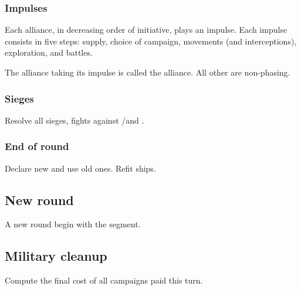 \subsubsection{Impulses}
Each alliance, in decreasing order of initiative, plays an impulse. Each
impulse consists in five steps: supply, choice of campaign, movements (and
interceptions), exploration, and battles.

The alliance taking its impulse is called the  alliance. All
other are non-phasing.

\subsubsection{Sieges}
Resolve all sieges, fights against \REVOLT/\REBELLION and \corsaire.

\subsubsection{End of round}
Declare new  and use old ones. Refit 
ships.

\subsection{New round}
A new round begin with the  segment.

\subsection{Military cleanup}
Compute the final cost of all campaigns paid this turn.

